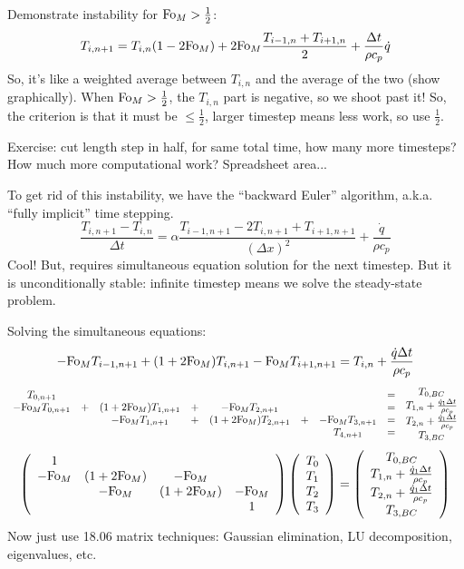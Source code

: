 \documentclass{report}
\begin{document}
Demonstrate instability for ${\rm Fo}_M > \frac{1}{2}$:
$$T_{i,n+1} = T_{i,n} (1-2{\rm Fo}_M) +
2 {\rm Fo}_M \frac{T_{i-1,n} + T_{i+1,n}}{2} +
\frac{\Delta t}{\rho c_p}\dot{q}$$
So, it's like a weighted average between $T_{i,n}$ and the average of the two
(show graphically).  When ${\rm Fo}_M>\frac{1}{2}$, the $T_{i,n}$ part is
negative, so we shoot past it!  So, the criterion is that it must be
$\leq\frac{1}{2}$, larger timestep means less work, so use $\frac{1}{2}$.

Exercise: cut length step in half, for same total time, how many more
timesteps?  How much more computational work?  Spreadsheet area...

To get rid of this instability, we have the ``backward Euler'' algorithm,
a.k.a. ``fully implicit'' time stepping.
$$\frac{T_{i,n+1} - T_{i,n}}{\Delta t} =
\alpha \frac{T_{i-1,n+1} - 2T_{i,n+1} + T_{i+1,n+1}}{(\Delta x)^2} +
\frac{\dot{q}}{\rho c_p}$$
Cool!  But, requires simultaneous equation solution for the next timestep.  But
it is unconditionally stable: infinite timestep means we solve the steady-state
problem.

Solving the simultaneous equations:
$$-{\rm Fo}_M T_{i-1,n+1} + (1+2{\rm Fo}_M) T_{i,n+1} - {\rm Fo}_M T_{i+1,n+1}
= T_{i,n} + \frac{\dot{q}\Delta t}{\rho c_p}$$
$$\begin{array}{cccccccc}T_{0,n+1} & & & & & & & =\\
  -{\rm Fo}_MT_{0,n+1}&+&(1+2{\rm Fo}_M)T_{1,n+1}&+&-{\rm Fo}_MT_{2,n+1} &&&=\\
  && -{\rm Fo}_MT_{1,n+1}&+&(1+2{\rm Fo}_M)T_{2,n+1}&+&-{\rm Fo}_MT_{3,n+1}&=\\
  & & & & & & T_{4,n+1} &= \end{array}
\begin{array}{c} T_{0,BC} \\ T_{1,n}+\frac{\dot{q}_1\Delta t}{\rho c_p} \\
  T_{2,n}+\frac{\dot{q}_1\Delta t}{\rho c_p} \\ T_{3,BC}\end{array}$$
$$\left(\begin{array}{cccc}
    1 & & & \\ -{\rm Fo}_M& (1+2{\rm Fo}_M)& -{\rm Fo}_M& \\
    & -{\rm Fo}_M& (1+2{\rm Fo}_M)& -{\rm Fo}_M \\ & & & 1 \end{array}\right)
\left(\begin{array}{c} T_0 \\ T_1 \\ T_2 \\ T_3 \end{array}\right) =
\left(\begin{array}{c} T_{0,BC} \\ T_{1,n}+\frac{\dot{q}_1\Delta t}{\rho c_p}\\
  T_{2,n}+\frac{\dot{q}_1\Delta t}{\rho c_p} \\ T_{3,BC}\end{array}\right)$$
Now just use 18.06 matrix techniques: Gaussian elimination, LU decomposition,
eigenvalues, etc.
\newpage
\end{document}
